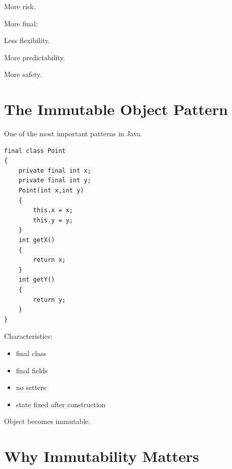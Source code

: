\documentclass[11pt,a4paper]{book}
\begin{document}
More risk.


More final:


Less flexibility.


More predictability.


More safety.


\section{The Immutable Object Pattern}

One of the most important patterns in Java.


\begin{verbatim}
final class Point
{
    private final int x;
    private final int y;
    Point(int x,int y)
    {
        this.x = x;
        this.y = y;
    }
    int getX()
    {
        return x;
    }
    int getY()
    {
        return y;
    }
}
\end{verbatim}


Characteristics:


\begin{itemize}
\item final class
\item final fields
\item no setters
\item state fixed after construction
\end{itemize}


Object becomes immutable.


\section{Why Immutability Matters}
\end{document}

